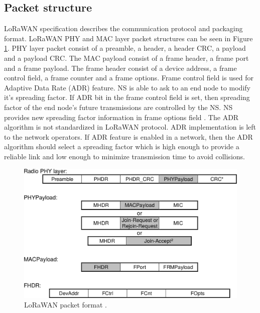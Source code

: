 \subsection{Packet structure}
LoRaWAN specification describes the communication protocol and packaging format. LoRaWAN PHY and MAC layer packet structures can be seen in Figure \ref{fig:lorawan_mac}. PHY layer packet consist of a preamble, a header, a header CRC, a payload and a payload CRC. The MAC payload consist of a frame header, a frame port and a frame payload. The frame header consist of a device address, a frame control field, a frame counter and a frame options. Frame control field is used for Adaptive Data Rate (ADR) feature. NS is able to ask to an end node to modify it's spreading factor. If ADR bit in the frame control field is set, then spreading factor of the end node's future transmissions are controlled by the NS. NS provides new spreading factor information in frame options field \cite{lorawan.specification}. The ADR algorithm is not standardized in LoRaWAN protocol. ADR implementation is left to the network operators. If ADR feature is enabled in a network, then the ADR algorithm should select a spreading factor which is high enough to provide a reliable link and low enough to minimize transmission time to avoid collisions.

\begin{figure}
\centering
\includegraphics[width=\linewidth]{fig/lorawan_mac.png}
\vspace*{4mm}
\caption{LoRaWAN packet format \cite{lorawan.specification}.}
\label{fig:lorawan_mac}
\end{figure}


